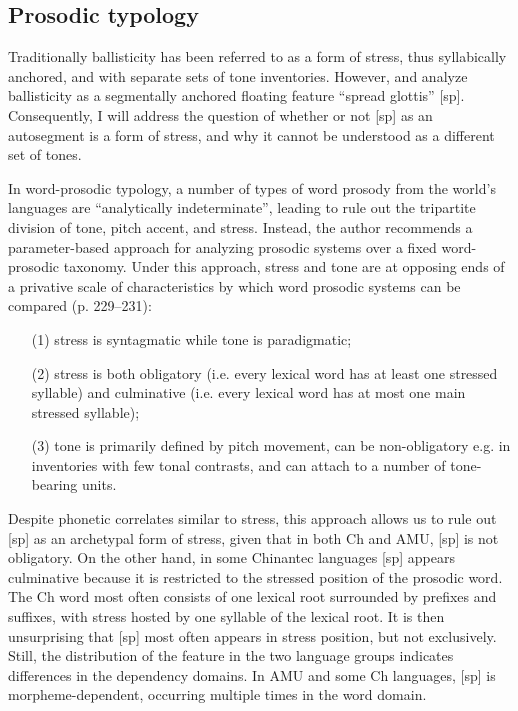 \documentclass[output=paper]{langscibook}
\begin{document}
\subsection{Prosodic typology}\label{sec:dobui:4.1}

Traditionally ballisticity has been referred to as a form of stress, thus syllabically anchored, and with separate sets of tone inventories. However, \citet{Silverman1994} and  \citet{Zendejas2000} analyze ballisticity as a segmentally anchored floating feature “spread glottis” [sp]. Consequently, I will address the question of whether or not [sp] as an autosegment is a form of stress, and why it cannot be understood as a different set of tones. 

\hspace*{-3.3pt}In word-prosodic typology, a number of types of word prosody from the world’s languages are “analytically indeterminate”, leading \citet{Hyman2006} to rule out the tripartite division of tone, pitch accent, and stress. Instead, the author recommends a parameter-based approach for analyzing prosodic systems over a fixed word-prosodic taxonomy. Under this approach, stress and tone are at opposing ends of a privative scale of characteristics by which word prosodic systems can be compared (p. 229--231):

\begin{itemize}
\item[(1)] stress is syntagmatic while tone is paradigmatic;
\item[(2)] stress is both obligatory (i.e. every lexical word has at least one stressed syllable) and culminative (i.e. every lexical word has at most one main stressed syllable);
\item[(3)] tone is primarily defined by pitch movement, can be non-obligatory e.g. in inventories with few tonal contrasts, and can attach to a number of tone-bearing units.
\end{itemize}

Despite phonetic correlates similar to stress, this approach allows us to rule out [sp] as an archetypal form of stress, given that in both Ch and AMU, [sp] is not obligatory. On the other hand, in some Chinantec languages [sp] appears culminative because it is restricted to the stressed position of the prosodic word. The Ch word most often consists of one lexical root surrounded by prefixes and suffixes, with stress hosted by one syllable of the lexical root. It is then unsurprising that [sp] most often appears in stress position, but not exclusively. Still, the distribution of the feature in the two language groups indicates differences in the dependency domains. In AMU and some Ch languages, [sp] is morpheme-dependent, occurring multiple times in the word domain. 
\end{document}

